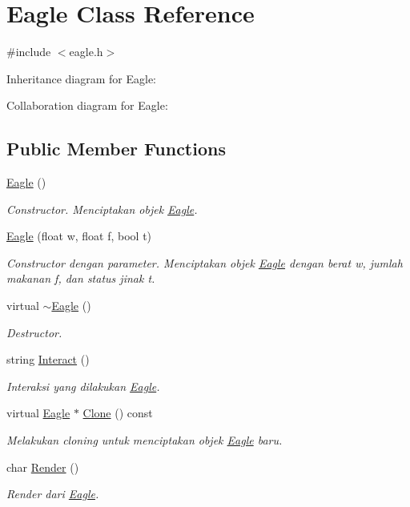 \hypertarget{classEagle}{}\section{Eagle Class Reference}
\label{classEagle}


{\ttfamily \#include $<$eagle.\+h$>$}



Inheritance diagram for Eagle\+:


Collaboration diagram for Eagle\+:
\subsection*{Public Member Functions}
\begin{DoxyCompactItemize}
\item 
\hyperlink{classEagle_a8b205e5b26bece07d18b852b042851fe}{Eagle} ()
\begin{DoxyCompactList}\small\item\em Constructor. Menciptakan objek \hyperlink{classEagle}{Eagle}. \end{DoxyCompactList}\item 
\hyperlink{classEagle_ae59cc80952be37499b10e270714af1d8}{Eagle} (float w, float f, bool t)
\begin{DoxyCompactList}\small\item\em Constructor dengan parameter. Menciptakan objek \hyperlink{classEagle}{Eagle} dengan berat w, jumlah makanan f, dan status jinak t. \end{DoxyCompactList}\item 
virtual \hyperlink{classEagle_a530318b3eb744ad26c9060d61aa314fe}{$\sim$\+Eagle} ()
\begin{DoxyCompactList}\small\item\em Destructor. \end{DoxyCompactList}\item 
string \hyperlink{classEagle_a64abae4f80bcdcba7dac9f03126f42aa}{Interact} ()
\begin{DoxyCompactList}\small\item\em Interaksi yang dilakukan \hyperlink{classEagle}{Eagle}. \end{DoxyCompactList}\item 
virtual \hyperlink{classEagle}{Eagle} $\ast$ \hyperlink{classEagle_ace8cb419354688615938d2a53d5c1566}{Clone} () const 
\begin{DoxyCompactList}\small\item\em Melakukan cloning untuk menciptakan objek \hyperlink{classEagle}{Eagle} baru. \end{DoxyCompactList}\item 
char \hyperlink{classEagle_a34e512cb19b5ba1f8a7bce937c57f33f}{Render} ()
\begin{DoxyCompactList}\small\item\em Render dari \hyperlink{classEagle}{Eagle}. \end{DoxyCompactList}\end{DoxyCompactItemize}
